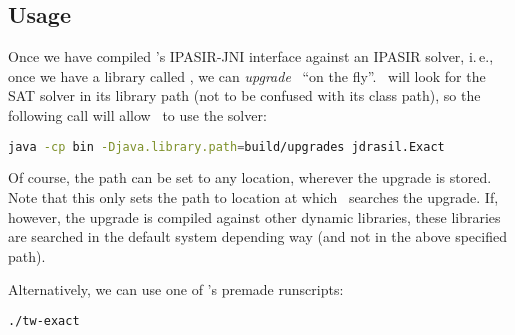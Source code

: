 \documentclass[a4paper, ukenglish, twoside, openright]{jdrasilmanual}
\begin{document}
\subsection{Usage}
Once we have compiled \Jdrasil's IPASIR-JNI interface against an
IPASIR solver, i.\,e., once we have a library called
, we can \emph{upgrade}
\Jdrasil\ ``on the fly''. \Jdrasil\ will look for the SAT solver in
its library path (not to be confused with its class path), so the
following call will allow \Jdrasil\ to use the solver:
\begin{lstlisting}[language=bash]
  java -cp bin -Djava.library.path=build/upgrades jdrasil.Exact
\end{lstlisting}
Of course, the path can be set to any location, wherever the upgrade
is stored. Note that this only sets the path to location at which
\Jdrasil\ searches the upgrade. If, however, the upgrade is compiled
against other dynamic libraries, these libraries are searched in the
default system depending way (and not in the above specified path).

Alternatively, we can use one of \Jdrasil's premade runscripts:
\begin{lstlisting}[language=bash]
  ./tw-exact
\end{lstlisting}



\end{document}
